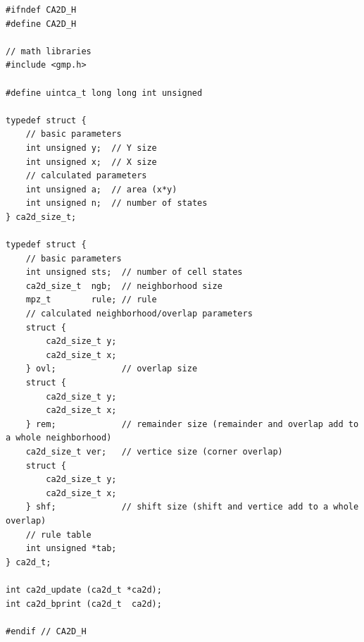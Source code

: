 \documentclass[12pt,a4paper,openany,twoside]{book}
\begin{document}
\vspace{5mm}
\lstset{language=C}
\begin{lstlisting}[frame=single]
#ifndef CA2D_H
#define CA2D_H

// math libraries
#include <gmp.h>

#define uintca_t long long int unsigned

typedef struct {
    // basic parameters
    int unsigned y;  // Y size
    int unsigned x;  // X size
    // calculated parameters
    int unsigned a;  // area (x*y)
    int unsigned n;  // number of states
} ca2d_size_t;

typedef struct {
    // basic parameters
    int unsigned sts;  // number of cell states
    ca2d_size_t  ngb;  // neighborhood size
    mpz_t        rule; // rule
    // calculated neighborhood/overlap parameters
    struct {
        ca2d_size_t y;
        ca2d_size_t x;
    } ovl;             // overlap size
    struct {
        ca2d_size_t y;
        ca2d_size_t x;
    } rem;             // remainder size (remainder and overlap add to a whole neighborhood)
    ca2d_size_t ver;   // vertice size (corner overlap)
    struct {
        ca2d_size_t y;
        ca2d_size_t x;
    } shf;             // shift size (shift and vertice add to a whole overlap)
    // rule table
    int unsigned *tab;
} ca2d_t;

int ca2d_update (ca2d_t *ca2d);
int ca2d_bprint (ca2d_t  ca2d);

#endif // CA2D_H
\end{lstlisting}



\newpage
{}
\listoffigures




\newpage


%
\label{stran_literatura}
 

\end{document}
